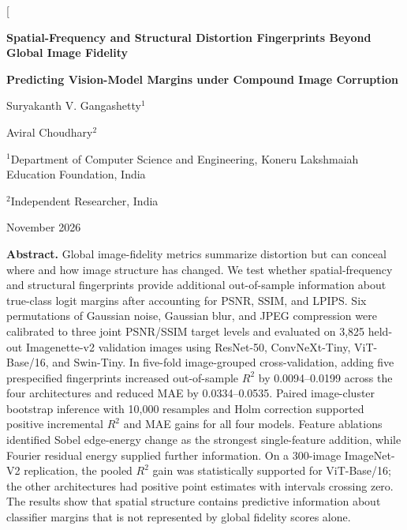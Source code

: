 \documentclass[10pt,twocolumn]{article}
\begin{document}
\twocolumn[
\begin{@twocolumnfalse}
\vspace*{-0.45em}
\begin{center}
{\LARGE\bfseries Spatial-Frequency and Structural Distortion Fingerprints Beyond Global Image Fidelity\par}
\vspace{0.25em}
{\large\bfseries Predicting Vision-Model Margins under Compound Image Corruption\par}
\vspace{0.65em}
{\large Suryakanth V. Gangashetty$^{1}$\par}
\vspace{0.12em}
{\large Aviral Choudhary$^{2}$\par}
\vspace{0.22em}
{\footnotesize $^{1}$Department of Computer Science and Engineering, Koneru Lakshmaiah Education Foundation, India\par}
{\footnotesize $^{2}$Independent Researcher, India\par}
\vspace{0.30em}
{\small November 2026\par}
\end{center}
\vspace{0.35em}
{\small\noindent\textbf{Abstract.} Global image-fidelity metrics summarize distortion but can conceal where and how image structure has changed. We test whether spatial-frequency and structural fingerprints provide additional out-of-sample information about true-class logit margins after accounting for PSNR, SSIM, and LPIPS. Six permutations of Gaussian noise, Gaussian blur, and JPEG compression were calibrated to three joint PSNR/SSIM target levels and evaluated on 3,825 held-out Imagenette-v2 validation images using ResNet-50, ConvNeXt-Tiny, ViT-Base/16, and Swin-Tiny. In five-fold image-grouped cross-validation, adding five prespecified fingerprints increased out-of-sample $R^2$ by 0.0094--0.0199 across the four architectures and reduced MAE by 0.0334--0.0535. Paired image-cluster bootstrap inference with 10,000 resamples and Holm correction supported positive incremental $R^2$ and MAE gains for all four models. Feature ablations identified Sobel edge-energy change as the strongest single-feature addition, while Fourier residual energy supplied further information. On a 300-image ImageNet-V2 replication, the pooled $R^2$ gain was statistically supported for ViT-Base/16; the other architectures had positive point estimates with intervals crossing zero. The results show that spatial structure contains predictive information about classifier margins that is not represented by global fidelity scores alone.\par\vspace{0.30em}}

\end{@twocolumnfalse}
\end{document}
